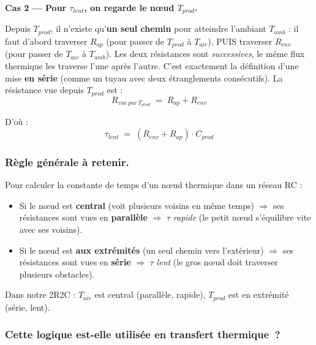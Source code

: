 \documentclass[11pt,a4paper]{article}
\begin{document}
\medskip
\textbf{Cas 2 — Pour $\tau_{lent}$, on regarde le nœud $T_{prod}$.}

Depuis $T_{prod}$, il n'existe qu'\textbf{un seul chemin} pour atteindre l'ambiant
$T_{amb}$ : il faut d'abord traverser $R_{ap}$ (pour passer de $T_{prod}$ à $T_{air}$),
PUIS traverser $R_{env}$ (pour passer de $T_{air}$ à $T_{amb}$). Les deux résistances
sont \emph{successives}, le même flux thermique les traverse l'une après l'autre. C'est
exactement la définition d'une mise \textbf{en série} (comme un tuyau avec deux
étranglements consécutifs). La résistance vue depuis $T_{prod}$ est :
\begin{equation}
R_{vue\,par\,T_{prod}} \;=\; R_{ap} + R_{env}
\end{equation}

D'où :
\begin{equation}
\boxed{\;\tau_{lent} \;=\; (R_{env} + R_{ap}) \cdot C_{prod}\;}
\end{equation}

\subsubsection*{Règle générale à retenir.}

\begin{tcolorbox}[breakable,enhanced jigsaw,colback=blue!4,colframe=blue!50!black,boxrule=0.4pt,arc=2pt]
Pour calculer la constante de temps d'un nœud thermique dans un réseau RC :
\begin{itemize}[itemsep=2pt]
\item Si le nœud est \textbf{central} (voit plusieurs voisins en même temps)
  $\Rightarrow$ ses résistances sont vues en \textbf{parallèle} $\Rightarrow$
  $\tau$ \emph{rapide} (le petit nœud s'équilibre vite avec ses voisins).
\item Si le nœud est \textbf{aux extrémités} (un seul chemin vers l'extérieur)
  $\Rightarrow$ ses résistances sont vues en \textbf{série} $\Rightarrow$
  $\tau$ \emph{lent} (le gros nœud doit traverser plusieurs obstacles).
\end{itemize}
Dans notre 2R2C : $T_{air}$ est central (parallèle, rapide), $T_{prod}$ est en extrémité
(série, lent).
\end{tcolorbox}

\subsubsection*{Cette logique est-elle utilisée en transfert thermique~?}
\end{document}
